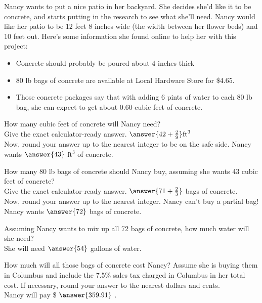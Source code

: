\documentclass{ximera}
\author{Debi Stout}
\begin{document}
Nancy wants to put a nice patio in her backyard. She decides she’d like it to be
concrete, and starts putting in the research to see what she’ll need. Nancy would like
her patio to be 12 feet 8 inches wide (the width between her flower beds) and 10 feet
out. Here’s some information she found online to help her with this project:
\begin{itemize}
\item Concrete should probably be poured about 4 inches thick
\item 80 lb bags of concrete are available at Local Hardware Store for \$4.65.
\item Those concrete packages say that with adding 6 pints of water to each 80 lb bag, she can expect to get about 0.60 cubic feet of concrete.
\end{itemize}

\begin{exercise}
How many cubic feet of concrete will Nancy need? \\
Give the exact calculator-ready answer.  $ \answer{42+\frac{2}{9}} \text{ft}^3$ \\
Now, round your answer up to the nearest integer to be on the safe side.  Nancy wants $ \answer{43}$ \calcHW $\text{ft}^3$ of concrete. \\
\begin{exercise}
How many 80 lb bags of concrete should Nancy buy, assuming she wants 43 cubic feet of concrete?\\
Give the exact calculator-ready answer.  $ \answer{71+\frac{2}{3}}$ bags of concrete.\\
Now, round your answer up to the nearest integer.  Nancy can't buy a partial bag!  Nancy wants $ \answer{72}$ \calcHW  bags of concrete. \\
\begin{exercise}
Assuming Nancy wants to mix up all 72 bags of concrete, how much water will she need? \\
She will need $\answer{54}$ gallons of water.\\
\begin{exercise}
How much will all those bags of concrete cost Nancy?  Assume she is buying them in Columbus and include the 7.5\% sales tax charged in Columbus in her total cost.  If necessary, round your answer to the nearest dollars and cents.\\
Nancy will pay \$ $\answer{359.91}$ \calcHW .
\end{exercise}
\end{exercise}
\end{exercise}
\end{exercise}
\end{document}
